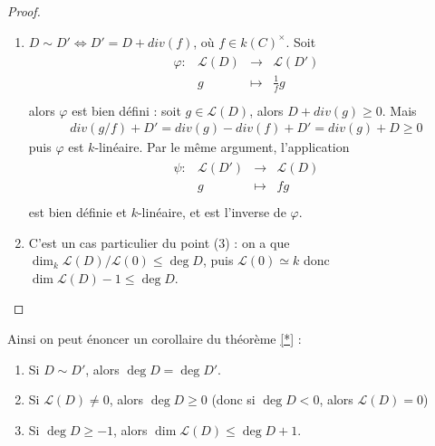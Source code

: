 \begin{proof}
\begin{enumerate}
                    \item $D \sim D' \iff D' = D + div(f)$, où $f \in k(C)^\times$. Soit 
                    \begin{align*}
                        \begin{array}{cccc}
                            \varphi : & \mathcal{L}(D) & \to & \mathcal{L}(D') \\
                            & g & \mapsto & \frac 1fg \\
                        \end{array}
                    \end{align*}
                    alors $\varphi$ est bien défini : soit $g \in \mathcal{L}(D)$, alors $D + div(g) \geq 0$. Mais 
                    \begin{align*}
                        div(g/f) + D' = div(g) - div(f) + D' = div(g) + D \geq 0
                    \end{align*}
                    puis $\varphi$ est $k$-linéaire. Par le même argument, l'application 
                    \begin{align*}
                        \begin{array}{cccc}
                            \psi : & \mathcal{L}(D') & \to & \mathcal{L}(D) \\
                            & g & \mapsto & fg \\
                        \end{array}
                    \end{align*}
                    est bien définie et $k$-linéaire, et est l'inverse de $\varphi$.
                    \item C'est un cas particulier du point (3) : on a que $\dim_k \mathcal{L}(D)/\mathcal{L}(0) \leq \deg D$, puis $\mathcal{L}(0) \simeq k$ donc $\dim \mathcal{L}(D) - 1 \leq \deg D$.
                \end{enumerate}
            \end{proof}
            Ainsi on peut énoncer un corollaire du théorème \ref{*} :
            \begin{coro}
                \begin{enumerate}
                    \item Si $D \sim D'$, alors $\deg D = \deg D'$.
                    \item Si $\mathcal{L}(D) \neq 0$, alors $\deg D \geq 0$ (donc si $\deg D < 0$, alors $\mathcal{L}(D) = 0$)
                    \item Si $\deg D \geq -1$, alors $\dim \mathcal{L}(D) \leq \deg D + 1$.
                \end{enumerate}
            \end{coro}
